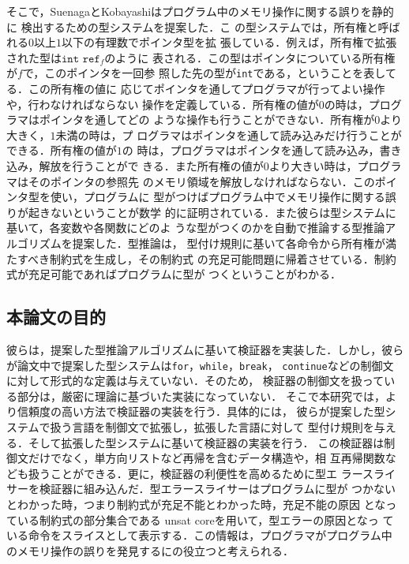 そこで，SuenagaとKobayashiはプログラム中のメモリ操作に関する誤りを静的に
検出するための型システム\cite {DBLP:conf/aplas/SuenagaK09}を提案した．こ
の型システムでは，所有権と呼ばれる$0$以上$1$以下の有理数でポインタ型を拡
張している．例えば，所有権で拡張された型は$\texttt{int\ ref}_{f}$のように
表される．この型はポインタについている所有権が$f$で，このポインタを一回参
照した先の型が\texttt{int}である，ということを表してる．この所有権の値に
応じてポインタを通してプログラマが行ってよい操作や，行わなければならない
操作を定義している．所有権の値が0の時は，プログラマはポインタを通してどの
ような操作も行うことができない．所有権が$0$より大きく，$1$未満の時は，プ
ログラマはポインタを通して読み込みだけ行うことができる．所有権の値が$1$の
時は，プログラマはポインタを通して読み込み，書き込み，解放を行うことがで
きる．また所有権の値が$0$より大きい時は，プログラマはそのポインタの参照先
のメモリ領域を解放しなければならない．このポインタ型を使い，プログラムに
型がつけばプログラム中でメモリ操作に関する誤りが起きないということが数学
的に証明されている．また彼らは型システムに基いて，各変数や各関数にどのよ
うな型がつくのかを自動で推論する型推論アルゴリズムを提案した．型推論は，
型付け規則に基いて各命令から所有権が満たすべき制約式を生成し，その制約式
の充足可能問題に帰着させている．制約式が充足可能であればプログラムに型が
つくということがわかる．

\label{background}

\subsection{本論文の目的}
彼らは，提案した型推論アルゴリズムに基いて検証器を実装した．しかし，彼ら
が論文中で提案した型システムは\verb|for|，\verb|while|，\verb|break|，
\verb|continue|などの制御文に対して形式的な定義は与えていない．そのため，
検証器の制御文を扱っている部分は，厳密に理論に基づいた実装になっていない．
そこで本研究では，より信頼度の高い方法で検証器の実装を行う．具体的には，
彼らが提案した型システムで扱う言語を制御文で拡張し，拡張した言語に対して
型付け規則を与える．そして拡張した型システムに基いて検証器の実装を行う．
この検証器は制御文だけでなく，単方向リストなど再帰を含むデータ構造や，相
互再帰関数なども扱うことができる．更に，検証器の利便性を高めるために型エ
ラースライサーを検証器に組み込んだ．型エラースライサーはプログラムに型が
つかないとわかった時，つまり制約式が充足不能とわかった時，充足不能の原因
となっている制約式の部分集合である unsat coreを用いて，型エラーの原因となっ
ている命令をスライスとして表示する．この情報は，プログラマがプログラム中
のメモリ操作の誤りを発見するにの役立つと考えられる．

